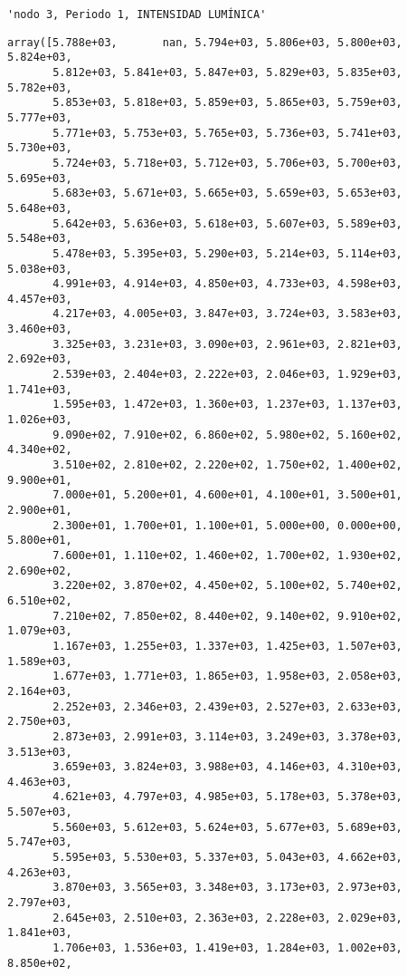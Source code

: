\documentclass[11pt]{article}
\begin{document}
    
    
    \begin{verbatim}
'nodo 3, Periodo 1, INTENSIDAD LUMÍNICA'
    \end{verbatim}

    
    
    \begin{verbatim}
array([5.788e+03,       nan, 5.794e+03, 5.806e+03, 5.800e+03, 5.824e+03,
       5.812e+03, 5.841e+03, 5.847e+03, 5.829e+03, 5.835e+03, 5.782e+03,
       5.853e+03, 5.818e+03, 5.859e+03, 5.865e+03, 5.759e+03, 5.777e+03,
       5.771e+03, 5.753e+03, 5.765e+03, 5.736e+03, 5.741e+03, 5.730e+03,
       5.724e+03, 5.718e+03, 5.712e+03, 5.706e+03, 5.700e+03, 5.695e+03,
       5.683e+03, 5.671e+03, 5.665e+03, 5.659e+03, 5.653e+03, 5.648e+03,
       5.642e+03, 5.636e+03, 5.618e+03, 5.607e+03, 5.589e+03, 5.548e+03,
       5.478e+03, 5.395e+03, 5.290e+03, 5.214e+03, 5.114e+03, 5.038e+03,
       4.991e+03, 4.914e+03, 4.850e+03, 4.733e+03, 4.598e+03, 4.457e+03,
       4.217e+03, 4.005e+03, 3.847e+03, 3.724e+03, 3.583e+03, 3.460e+03,
       3.325e+03, 3.231e+03, 3.090e+03, 2.961e+03, 2.821e+03, 2.692e+03,
       2.539e+03, 2.404e+03, 2.222e+03, 2.046e+03, 1.929e+03, 1.741e+03,
       1.595e+03, 1.472e+03, 1.360e+03, 1.237e+03, 1.137e+03, 1.026e+03,
       9.090e+02, 7.910e+02, 6.860e+02, 5.980e+02, 5.160e+02, 4.340e+02,
       3.510e+02, 2.810e+02, 2.220e+02, 1.750e+02, 1.400e+02, 9.900e+01,
       7.000e+01, 5.200e+01, 4.600e+01, 4.100e+01, 3.500e+01, 2.900e+01,
       2.300e+01, 1.700e+01, 1.100e+01, 5.000e+00, 0.000e+00, 5.800e+01,
       7.600e+01, 1.110e+02, 1.460e+02, 1.700e+02, 1.930e+02, 2.690e+02,
       3.220e+02, 3.870e+02, 4.450e+02, 5.100e+02, 5.740e+02, 6.510e+02,
       7.210e+02, 7.850e+02, 8.440e+02, 9.140e+02, 9.910e+02, 1.079e+03,
       1.167e+03, 1.255e+03, 1.337e+03, 1.425e+03, 1.507e+03, 1.589e+03,
       1.677e+03, 1.771e+03, 1.865e+03, 1.958e+03, 2.058e+03, 2.164e+03,
       2.252e+03, 2.346e+03, 2.439e+03, 2.527e+03, 2.633e+03, 2.750e+03,
       2.873e+03, 2.991e+03, 3.114e+03, 3.249e+03, 3.378e+03, 3.513e+03,
       3.659e+03, 3.824e+03, 3.988e+03, 4.146e+03, 4.310e+03, 4.463e+03,
       4.621e+03, 4.797e+03, 4.985e+03, 5.178e+03, 5.378e+03, 5.507e+03,
       5.560e+03, 5.612e+03, 5.624e+03, 5.677e+03, 5.689e+03, 5.747e+03,
       5.595e+03, 5.530e+03, 5.337e+03, 5.043e+03, 4.662e+03, 4.263e+03,
       3.870e+03, 3.565e+03, 3.348e+03, 3.173e+03, 2.973e+03, 2.797e+03,
       2.645e+03, 2.510e+03, 2.363e+03, 2.228e+03, 2.029e+03, 1.841e+03,
       1.706e+03, 1.536e+03, 1.419e+03, 1.284e+03, 1.002e+03, 8.850e+02,

\end{verbatim}
\end{document}
